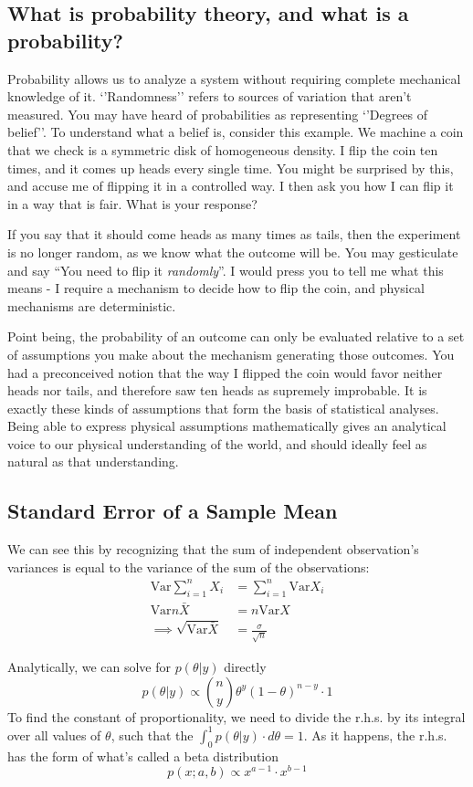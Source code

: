 \documentclass[11pt,a4paper,article]{memoir} %
\begin{document}
\subsection{What is probability theory, and what is a probability?}
Probability allows us to analyze a system without requiring complete mechanical knowledge of it. `'Randomness'' refers to sources of variation that aren't measured. You may have heard of probabilities as representing `'Degrees of belief''. To understand what a belief is, consider this example. We machine a coin that we check is a symmetric disk of homogeneous density. I flip the coin ten times, and it comes up heads every single time. You might be surprised by this, and accuse me of flipping it in a controlled way. I then ask you how I can flip it in a way that is fair. What is your response?
\par
If you say that it should come heads as many times as tails, then the experiment is no longer random, as we know what the outcome will be. You may gesticulate and say ``You need to flip it \emph{randomly}''. I would press you to tell me what this means - I require a mechanism to decide how to flip the coin, and physical mechanisms are deterministic.
\par
Point being, the probability of an outcome can only be evaluated relative to a set of assumptions you make about the mechanism generating those outcomes. You had a preconceived notion that the way I flipped the coin would favor neither heads nor tails, and therefore saw ten heads as supremely improbable. It is exactly these kinds of assumptions that form the basis of statistical analyses. Being able to express physical assumptions mathematically gives an analytical voice to our physical understanding of the world, and should ideally feel as natural as that understanding.
\newpage

\subsection{Standard Error of a Sample Mean}
We can see this by recognizing that the sum of independent observation's variances is equal to the variance of the sum of the observations:
\begin{align}
 \text{Var}\sum_{i = 1}^n X_i &= \sum_{i = 1}^n \text{Var}X_i\\
	\text{Var}n\bar{X} &= n\text{Var}X \\
	\implies \sqrt{\text{Var}\bar{X}} &= \frac{\sigma}{\sqrt{n}}
\end{align}
\par
Analytically, we can solve for $p(\theta|y)$ directly
\[
  p(\theta|y) \propto \binom{n}{y}\theta^y (1 - \theta)^{n-y}\cdot 1
\]
To find the constant of proportionality, we need to divide the r.h.s. by its integral over all values of $\theta$, such that the $\int_0^1 p(\theta|y)\cdot d\theta = 1$. As it happens, the r.h.s. has the form of what's called a beta distribution
\[
  p(x; a, b) \propto x^{a - 1}\cdot x^{b-1}
\]
\end{document}
